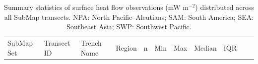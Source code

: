 \documentclass[final]{agujournal2019}
\begin{document}
\begin{longtable}[]{@{}
  >{\raggedright\arraybackslash}p{}
  >{\raggedleft\arraybackslash}p{}
  >{\raggedleft\arraybackslash}p{}
  >{\raggedleft\arraybackslash}p{}
  >{\raggedleft\arraybackslash}p{}
  >{\raggedleft\arraybackslash}p{}
  >{\raggedleft\arraybackslash}p{}
  >{\raggedleft\arraybackslash}p{}
  >{\raggedleft\arraybackslash}p{}
  >{\raggedleft\arraybackslash}p{}
  >{\raggedleft\arraybackslash}p{}@{}}
\caption{Summary statistics of surface heat flow observations (mW
m\(^{-2}\)) distributed across all SubMap transects. NPA: North
Pacific--Aleutians; SAM: South America; SEA: Southeast Asia; SWP:
Southwest Pacific.}\label{tbl:submap-obs-summary-table}\tabularnewline
\toprule\noalign{}
\begin{minipage}[b]{\linewidth}\raggedright
SubMap Set
\end{minipage} & \begin{minipage}[b]{\linewidth}\raggedleft
Transect ID
\end{minipage} & \begin{minipage}[b]{\linewidth}\raggedleft
Trench Name
\end{minipage} & \begin{minipage}[b]{\linewidth}\raggedleft
Region
\end{minipage} & \begin{minipage}[b]{\linewidth}\raggedleft
n
\end{minipage} & \begin{minipage}[b]{\linewidth}\raggedleft
Min
\end{minipage} & \begin{minipage}[b]{\linewidth}\raggedleft
Max
\end{minipage} & \begin{minipage}[b]{\linewidth}\raggedleft
Median
\end{minipage} & \begin{minipage}[b]{\linewidth}\raggedleft
IQR
\end{minipage} & \begin{minipage}[b]{\linewidth}\raggedleft

\end{minipage}
\end{longtable}
\end{document}
